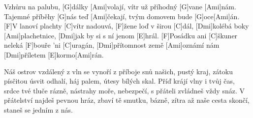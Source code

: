 
\sloka
[Ami]Vzhůru na palubu, [G]dálky [Ami]volají,
vítr už příhodný [G]vane [Ami]nám.
Tajemné příběhy [G]nás teď [Ami]čekají,
tvým domovem bude [G]oce[Ami]án.
[F]V lanoví plachty [C]vítr nadouvá,
[F]žene loď v širou [C]dál,
[Dmi]kolébá boky [Ami]plachetnice,
[Dmi]jak by si s ní jenom [E]hrál.
[F]Posádku ani [C]škuner neleká
[F]bouře ’ni [C]uragán,
[Dmi]přítomnost země [Ami]oznámí nám
[Dmi]příletem [E]kormo[Ami]rán.

\sloka
Náš ostrov vzdálený z vln se vynoří
z příboje snů našich, pustý kraj,
zátoku písčitou úsvit odhalí,
háj palem, útesy bílých skal.
Příď krájí vlny i tvůj čas,
srdce tvé tluče rázně,
nástrahy moře, nebezpečí,
s přáteli zvládneš vždy snáz.
V přátelství najdeš pevnou hráz,
zbaví tě smutku, bázně,
zítra až naše cesta skončí,
staneš se jedním z nás.
